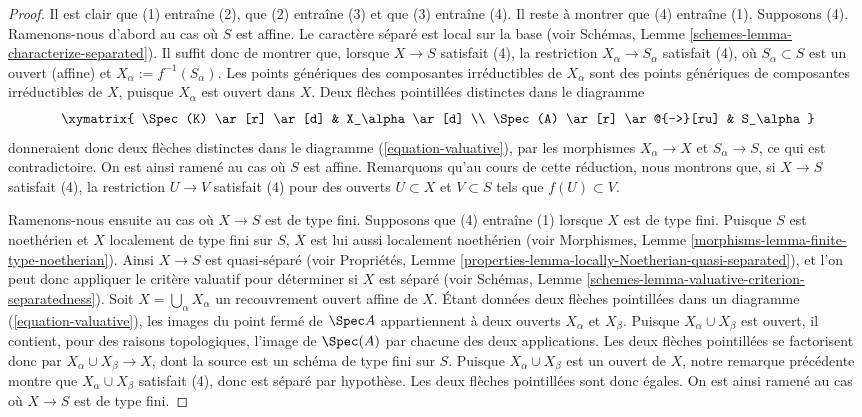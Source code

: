 \begin{proof}
Il est clair que (1) entraîne (2), que (2) entraîne (3) et que (3) entraîne (4).
Il reste à montrer que (4) entraîne (1). Supposons (4).
Ramenons-nous d'abord au cas où $S$ est affine. Le caractère séparé est local
sur la base (voir
Schémas, Lemme \ref{schemes-lemma-characterize-separated}).
Il suffit donc de montrer que, lorsque
$X \to S$ satisfait (4), la restriction $X_\alpha \to S_\alpha$ satisfait (4),
où $S_\alpha \subset S$ est un ouvert (affine) et $X_\alpha :=
f^{-1}(S_\alpha)$. Les
points génériques des composantes irréductibles de $X_\alpha$ sont des
points génériques de composantes irréductibles de $X$, puisque $X_\alpha$ est
ouvert dans $X$. Deux flèches pointillées distinctes dans le diagramme
\begin{equation}
\label{equation-valuative-alpha}
\xymatrix{
\Spec(K) \ar[r] \ar[d] & X_\alpha \ar[d] \\
\Spec(A) \ar[r] \ar@{-->}[ru] & S_\alpha
}
\end{equation}
donneraient donc deux flèches distinctes dans le diagramme
(\ref{equation-valuative}), par les morphismes $X_\alpha \to X$ et
$S_\alpha \to S$, ce qui est contradictoire. On est ainsi ramené
au cas où $S$ est affine. Remarquons qu'au cours de cette
réduction, nous montrons que, si $X \to S$ satisfait (4), la restriction $U
\to V$ satisfait (4) pour des ouverts $U \subset X$ et $V \subset S$ tels que
$f(U) \subset V$.

\medskip\noindent
Ramenons-nous ensuite au cas où $X \to S$ est de type fini. Supposons
que (4) entraîne (1) lorsque $X$ est de type fini. Puisque
$S$ est noethérien et $X$ localement de type fini sur $S$,
$X$ est lui aussi localement noethérien (voir Morphismes,
Lemme \ref{morphisms-lemma-finite-type-noetherian}).
Ainsi $X \to S$ est quasi-séparé (voir
Propriétés, Lemme \ref{properties-lemma-locally-Noetherian-quasi-separated}),
et l'on peut donc appliquer le critère valuatif pour déterminer si $X$
est séparé (voir
Schémas, Lemme \ref{schemes-lemma-valuative-criterion-separatedness}).
Soit $X = \bigcup_\alpha X_\alpha$ un recouvrement ouvert
affine de $X$. Étant données deux flèches pointillées dans un diagramme
(\ref{equation-valuative}), les images du point fermé de
$\Spec A$
appartiennent à deux ouverts $X_\alpha$ et $X_\beta$. Puisque $X_\alpha \cup
X_\beta$ est ouvert, il contient, pour des raisons topologiques, l'image de
$\Spec(A)$ par chacune des deux applications. Les deux flèches pointillées se factorisent donc
par $X_\alpha \cup X_\beta \to X$, dont la source est un schéma de type fini sur
$S$. Puisque $X_\alpha \cup X_\beta$ est un ouvert de $X$, notre
remarque précédente montre que $X_\alpha \cup X_\beta$ satisfait (4), donc
est séparé par hypothèse. Les deux flèches pointillées
sont donc égales. On est ainsi ramené au cas où $X \to S$ est de type fini.


\end{proof}
